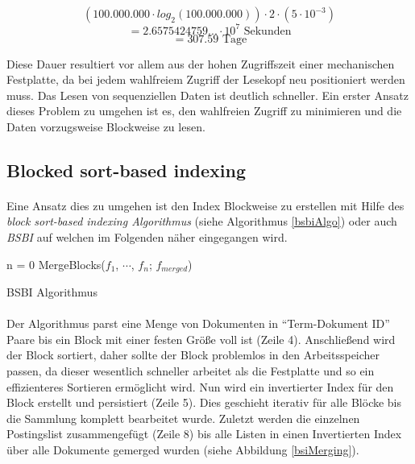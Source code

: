 \[(100.000.000 \cdot log_2 (100.000.000)) \cdot 2 \cdot (5 \cdot 10^{-3}) \]
\[ = 2.6575424759... \cdot 10^7 \text{ Sekunden}\]
\[ = 307.59 \text{ Tage} \]

Diese Dauer resultiert vor allem aus der hohen Zugriffszeit einer mechanischen Festplatte, da bei jedem wahlfreiem Zugriff der Lesekopf neu positioniert werden muss. Das Lesen von sequenziellen Daten ist deutlich schneller. Ein erster Ansatz dieses Problem zu umgehen ist es, den wahlfreien Zugriff zu minimieren und die Daten vorzugsweise Blockweise zu lesen.
\par

\subsection{Blocked sort-based indexing}
\paragraph{}
Eine Ansatz dies zu umgehen ist den Index Blockweise zu erstellen mit Hilfe des \textit{block sort-based indexing Algorithmus} (siehe Algorithmus \ref{bsbiAlgo}) oder auch \textit{BSBI} auf welchen im Folgenden näher eingegangen wird.
\par
\begin{algorithm}
 n = 0\;
  MergeBlocks($f_1$, $\cdots$, $f_n$; $f_{merged}$)\;
\caption{BSBI Algorithmus} \label{bsbiAlgo}
\end{algorithm}

\paragraph{}
Der Algorithmus parst eine Menge von Dokumenten in \enquote{Term-Dokument ID} Paare bis ein Block mit einer festen Größe voll ist (Zeile 4). Anschließend wird der Block sortiert, daher sollte der Block problemlos in den Arbeitsspeicher passen, da dieser wesentlich schneller arbeitet als die Festplatte und so ein effizienteres Sortieren ermöglicht wird. Nun wird ein invertierter Index für den Block erstellt und persistiert (Zeile 5). Dies geschieht iterativ für alle Blöcke bis die Sammlung komplett bearbeitet wurde. Zuletzt werden die einzelnen Postingslist zusammengefügt (Zeile 8) bis alle Listen in einen Invertierten Index über alle Dokumente gemerged wurden (siehe Abbildung \ref{bsiMerging}). 
\par

